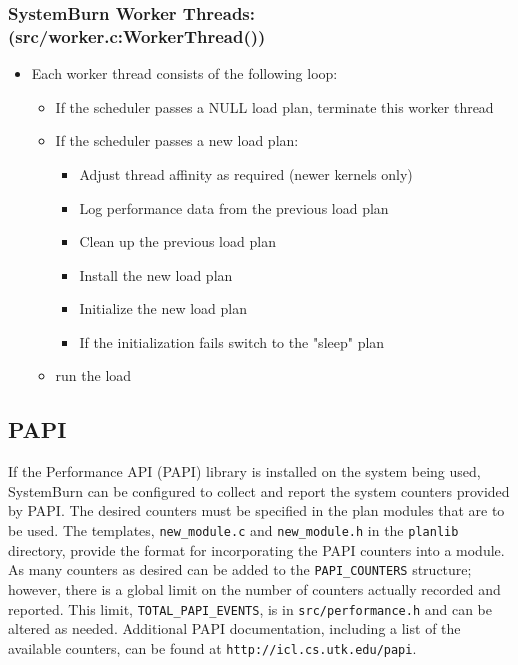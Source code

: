 \subsubsection{SystemBurn Worker Threads: (src/worker.c:WorkerThread())}

\begin{itemize}
	\item Each worker thread consists of the following loop:
	\begin{itemize}
		\item If the scheduler passes a NULL load plan, terminate this worker thread
		\item If the scheduler passes a new load plan:
		\begin{itemize}
			\item Adjust thread affinity as required (newer kernels only)
			\item Log performance data from the previous load plan
			\item Clean up the previous load plan
			\item Install the new load plan
			\item Initialize the new load plan
			\item If the initialization fails switch to the "sleep" plan
		\end{itemize}
		\item run the load
	\end{itemize}
\end{itemize}


\subsection{PAPI}

If the Performance API (PAPI) library is installed on the system being used, 
SystemBurn can be configured to collect and report the system counters provided by PAPI.
The desired counters must be specified in the plan modules that are to be used.
The templates, \verb!new_module.c! and \verb!new_module.h! in the \verb!planlib! directory, 
provide the format for incorporating the PAPI counters into a module.
As many counters as desired can be added to the \verb!PAPI_COUNTERS! structure;
however, there is a global limit on the  number of counters actually recorded and reported.
This limit, \verb!TOTAL_PAPI_EVENTS!, is in \verb!src/performance.h! and can be altered as needed.
Additional PAPI documentation, including a list of the available counters, can be found at 
\verb!http://icl.cs.utk.edu/papi!.
